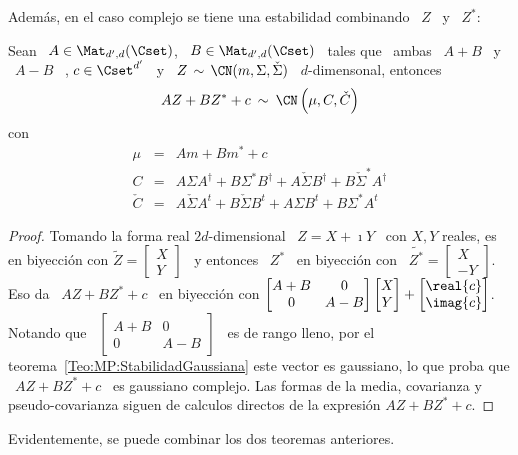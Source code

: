 Adem\'as, en el  caso complejo se tiene  una estabilidad combinando \ $Z$  \ y \
$Z^*$:
%
\begin{teorema}%
\label{Teo:MP:StabilidadGaussianaComplejaZZestrella}
%
Sean \ $A \in \Mat_{d',d}(\Cset)$, \  $B \in \Mat_{d',d}(\Cset)$ \ tales que \ ambas
\ $A+B$ \ y \  $A-B$ \ \SZ{sean de rango lleno}, $c \in \Cset^{d'}$  \ y \ $Z \,
\sim \, \CN(m,\Sigma,\check{\Sigma})$ \ $d$-dimensonal, entonces
  \[
  A Z + B Z^* + c \: \sim \: \CN\left( \mu , C , \check{C}  \right)
  \]
  con
  \[
  \begin{array}{lll}
  \mu & = & A m + B m^* + c\\[2.5mm]
  C & = & A \Sigma A^\dag + B \Sigma^* B^\dag + A \check{\Sigma} B^\dag + B
  \check{\Sigma}^* A^\dag\\[2.5mm]
  \check{C} & = & A \check{\Sigma} A^t + B \check{\Sigma} B^t + A \Sigma B^t + B
  \Sigma^* A^t
  \end{array}
  \]
\end{teorema}
\begin{proof}
  Tomando la forma real $2d$-dimensional \ $Z = X + \imath Y$ \ con $X, Y$
  reales,   es  en   biyecci\'on  con   $\widetilde{Z}  =   \begin{bmatrix}  X\\
    Y   \end{bmatrix}$  \  y   entonces  \   $Z^*$  \   en  biyecci\'on   con  \
  $\widetilde{Z^*} = \begin{bmatrix} X\\-Y \end{bmatrix}$. Eso da \ $A Z + B Z^*
  +   c$   \   en   biyecci\'on   con   $\begin{bmatrix}   A+B   &   0\\   0   &
    A-B \end{bmatrix} \begin{bmatrix} X\\ Y \end{bmatrix} + \begin{bmatrix}
    \real{c}\\ \imag{c} \end{bmatrix}$. Notando que \ $\begin{bmatrix} A+B & 0\\
    0    &   A-B    \end{bmatrix}$   \    es    de   rango    lleno,   por    el
  teorema~\ref{Teo:MP:StabilidadGaussiana} este vector es gaussiano, lo que proba
  que \  $A Z  + B  Z^* + c$  \ es  gaussiano complejo. Las  formas de  la media,
  covarianza y  pseudo-covarianza siguen de calculos directos  de la expresi\'on
  $A Z + B Z^* + c$.
\end{proof}
%
Evidentemente, se puede combinar los dos teoremas anteriores.

